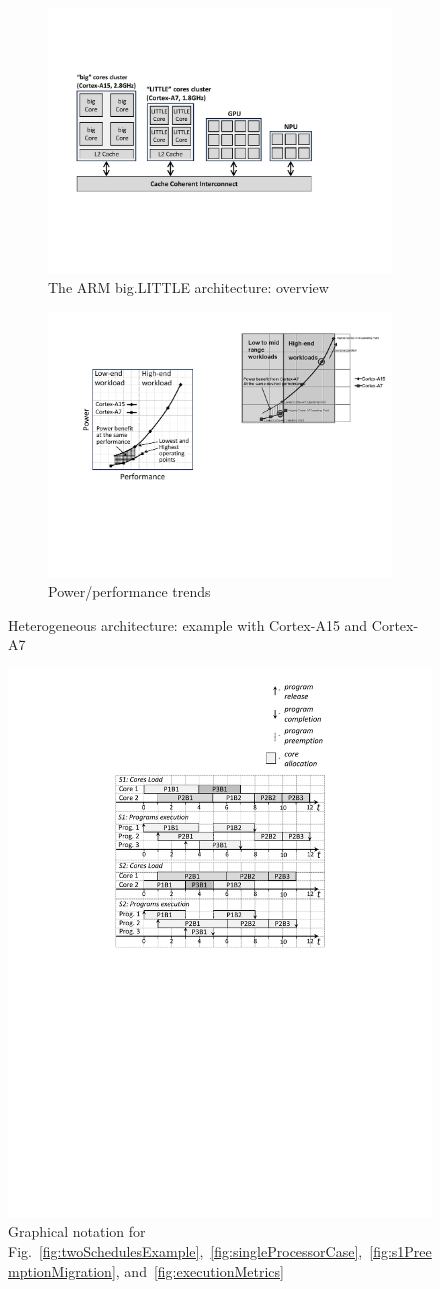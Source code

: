 \begin{figure}
\begin{subfigure}{.85\columnwidth}
\includegraphics[width=1\linewidth]{figs/bigLITTLEArchitecture.pdf}
\vspace{1mm}
\caption{The ARM big.LITTLE architecture: overview}
\label{fig:bigLITTLEArchitecture}
\end{subfigure}

\begin{subfigure}{.95\columnwidth}
\includegraphics[width=.4\linewidth]{figs/CortexA15vsA7Comparison.pdf}
\vspace{1mm}
\caption{Power/performance trends}
\label{fig:CortexA15A7Comparison}
\end{subfigure}
\caption{Heterogeneous architecture: example with Cortex-A15 and Cortex-A7}
\end{figure}

\begin{figure}
\centering
\includegraphics[width=.18\columnwidth]{figs/notation.pdf}
\caption{Graphical notation for Fig.~\ref{fig:twoSchedulesExample},~\ref{fig:singleProcessorCase},~\ref{fig:s1PreemptionMigration}, and~\ref{fig:executionMetrics}}
\label{fig:notation}
\end{figure}

